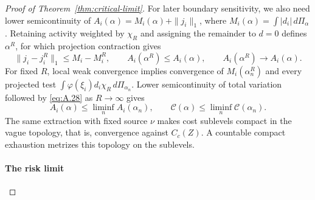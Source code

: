 \begin{proof}[Proof of Theorem~\ref{thm:critical-limit}]
\label{step:coordinate-lsc}
For later boundary sensitivity, we also need lower semicontinuity of \(A_i(\alpha)=M_i(\alpha)+\|j_i\|_1\), where \(M_i(\alpha)=\int|d_i|\,d\Pi_\alpha\). Retaining activity weighted by \(\chi_R\) and assigning the remainder to \(d=0\) defines \(\alpha^R\), for which projection contraction gives
\begin{equation}
\|j_i-j_i^R\|_1\le M_i-M_i^R,\qquad
A_i(\alpha^R)\le A_i(\alpha),\qquad A_i(\alpha^R)\to A_i(\alpha).
\tag{A.28}\label{eq:A.28}
\end{equation}
For fixed \(R\), local weak convergence implies convergence of \(M_i(\alpha_n^R)\) and every projected test \(\int\varphi(\xi_i)d_i\chi_R\,d\Pi_{\alpha_n}\). Lower semicontinuity of total variation followed by \eqref{eq:A.28} as \(R\to\infty\) gives
\begin{equation}
A_i(\alpha)\le\liminf_n A_i(\alpha_n),\qquad
\mathcal C(\alpha)\le\liminf_n\mathcal C(\alpha_n).
\tag{A.29}\label{eq:A.29}
\end{equation}
The same extraction with fixed source \(\nu\) makes cost sublevels compact in the vague topology, that is, convergence against \(C_c(Z)\). A countable compact exhaustion metrizes this topology on the sublevels.

\paragraph{The risk limit}\label{par:risk-limit}


\end{proof}
